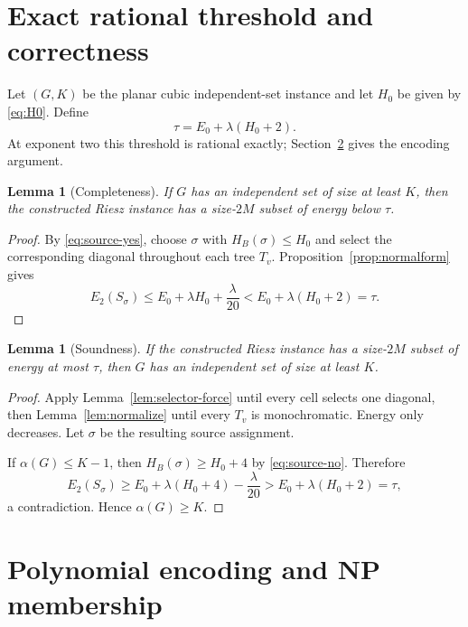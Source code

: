 \documentclass[12pt,a4paper]{article}
\newtheorem{lemma}[theorem]{Lemma}
\begin{document}
\section{Exact rational threshold and correctness}\label{sec:threshold}

Let $(G,K)$ be the planar cubic independent-set instance and let $H_0$ be given by \eqref{eq:H0}.  Define
\begin{equation}\label{eq:Tstar}
 \tau=E_0+\lambda(H_0+2).
\end{equation}
At exponent two this threshold is rational exactly; Section~\ref{sec:encoding} gives the encoding argument.

\begin{lemma}[Completeness]\label{lem:complete}
If $G$ has an independent set of size at least $K$, then the constructed Riesz instance has a size-$2M$ subset of energy below $\tau$.
\end{lemma}

\begin{proof}
By \eqref{eq:source-yes}, choose $\sigma$ with $H_B(\sigma)\le H_0$ and select the corresponding diagonal throughout each tree $T_v$.  Proposition~\ref{prop:normalform} gives
\[
 E_2(S_\sigma)\le E_0+\lambda H_0+\frac{\lambda}{20}<E_0+\lambda(H_0+2)=\tau.
\]
\end{proof}

\begin{lemma}[Soundness]\label{lem:sound}
If the constructed Riesz instance has a size-$2M$ subset of energy at most $\tau$, then $G$ has an independent set of size at least $K$.
\end{lemma}

\begin{proof}
Apply Lemma~\ref{lem:selector-force} until every cell selects one diagonal, then Lemma~\ref{lem:normalize} until every $T_v$ is monochromatic.  Energy only decreases.  Let $\sigma$ be the resulting source assignment.

If $\alpha(G)\le K-1$, then $H_B(\sigma)\ge H_0+4$ by \eqref{eq:source-no}.  Therefore
\[
 E_2(S_\sigma)
 \ge E_0+\lambda(H_0+4)-\frac{\lambda}{20}
 >E_0+\lambda(H_0+2)=\tau,
\]
a contradiction.  Hence $\alpha(G)\ge K$.
\end{proof}

\section{Polynomial encoding and NP membership}\label{sec:encoding}
\end{document}
